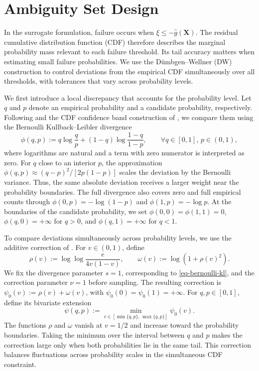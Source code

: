 \documentclass[review,11pt,3p,authoryear,nopreprintline]{elsarticle}
\begin{document}
\section{Ambiguity Set Design}
\label{sec-ambiguity-set}

In the surrogate formulation, failure occurs when $\xi\le-\hat g(\bm X)$. The residual cumulative distribution function (CDF) therefore describes the marginal probability mass relevant to each failure threshold. Its tail accuracy matters when estimating small failure probabilities. We use the D\"umbgen--Wellner (DW) construction \citep{L.J23} to control deviations from the empirical CDF simultaneously over all thresholds, with tolerances that vary across probability levels.

We first introduce a local discrepancy that accounts for the probability level. Let $q$ and $p$ denote an empirical probability and a candidate probability, respectively. Following \citet{B.J79} and the CDF confidence band construction of \citet{O95}, we compare them using the Bernoulli Kullback--Leibler divergence
\begin{equation}
  \phi(q,p):=q\log\frac{q}{p}+(1-q)\log\frac{1-q}{1-p},\qquad \forall q\in[0,1],\, p\in(0,1),
  \label{eq-bernoulli-kl}
\end{equation}
where logarithms are natural and a term with zero numerator is interpreted as zero. For $q$ close to an interior $p$, the approximation $\phi(q,p)\approx(q-p)^2/[2p(1-p)]$ scales the deviation by the Bernoulli variance. Thus, the same absolute deviation receives a larger weight near the probability boundaries. The full divergence also covers zero and full empirical counts through $\phi(0,p)=-\log(1-p)$ and $\phi(1,p)=-\log p$. At the boundaries of the candidate probability, we set $\phi(0,0)=\phi(1,1)=0$, $\phi(q,0)=+\infty$ for $q>0$, and $\phi(q,1)=+\infty$ for $q<1$.

To compare deviations simultaneously across probability levels, we use the additive correction of \citet{L.J23}. For $v\in(0,1)$, define
\begin{equation}
  \rho(v):=\log\log\frac{e}{4v(1-v)},\qquad \omega(v):=\log\!\left(1+\rho(v)^2\right).
  \label{eq-dw-correction-functions}
\end{equation}
We fix the divergence parameter $s=1$, corresponding to \eqref{eq-bernoulli-kl}, and the correction parameter $\nu=1$ before sampling. The resulting correction is $\psi_0(v):=\rho(v)+\omega(v)$, with $\psi_0(0)=\psi_0(1)=+\infty$. For $q,p\in[0,1]$, define its bivariate extension
\begin{equation}
  \psi(q,p):=\min_{v\in[\min\{q,p\},\,\max\{q,p\}]}\psi_0(v).
  \label{eq-dw-bivariate-correction}
\end{equation}
The functions $\rho$ and $\omega$ vanish at $v=1/2$ and increase toward the probability boundaries. Taking the minimum over the interval between $q$ and $p$ makes the correction large only when both probabilities lie in the same tail. This correction balances fluctuations across probability scales in the simultaneous CDF constraint.
\end{document}
